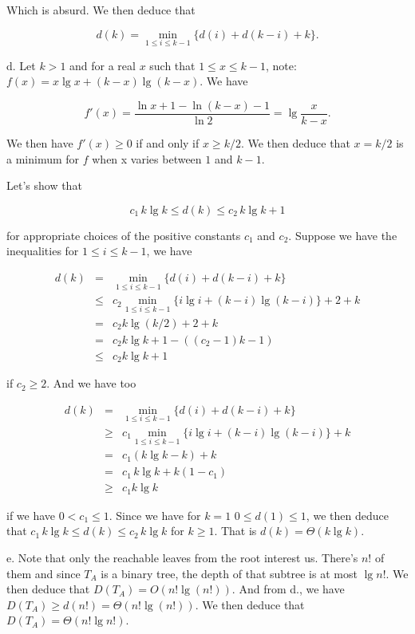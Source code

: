 \documentclass[a4paper,12pt]{article}
\newcommand{\subpar}[1]{\medskip \noindent #1.}
\begin{document}
Which is absurd.  We then deduce that

\[ d(k) = \min_{1\le i\le k-1}\{d(i) + d(k-i) + k\}.\]

\subpar{d}  Let $k>1$ and for a real $x$ such that $1 \le x\le k-1$,
note: $f(x) = x \lg x + (k-x)\lg (k-x)$.  We have

\[  f'(x) = \frac{\ln x + 1 - \ln(k-x) - 1}{\ln 2} = \lg\frac{x}{k-x}.\]

We then have $f'(x) \ge 0$ if and only if $x \ge k/2$.  We then deduce
that $x = k/2$ is a minimum for $f$ when x varies between $1$ and
$k-1$.

\medskip
Let's show that

\[ c_1\,k\lg k \le d(k) \le c_2\,k\lg k + 1\]

for appropriate choices of the positive constants $c_1$ and $c_2$.
Suppose we have the inequalities for $1\le i\le k-1$, we have

\begin{eqnarray*}
  d(k) &=& \min_{1\le i\le k-1}\{ d(i) + d(k-i) + k\} \\
  &\le& c_2 \min_{1\le i\le k-1}\{i\lg i + (k-i)\lg (k-i) \} + 2
  + k\\
  &=& c_2 k \lg (k/2) + 2 + k \\
  &=& c_2 k \lg k + 1 - ((c_2 - 1)k - 1) \\
  &\le& c_2 k\lg k + 1
\end{eqnarray*}

if $c_2 \ge 2$.  And we have too

\begin{eqnarray*}
  d(k) &=& \min_{1\le i\le k-1}\{ d(i) + d(k-i) + k\} \\
  &\ge& c_1 \min_{1\le i\le k-1}\{ i \lg i + (k-i)\lg(k-i)\} + k \\
  &=& c_1 (k \lg k - k) + k \\
  &=& c_1\,k \lg k + k(1-c_1) \\
  &\ge& c_1k\lg k
\end{eqnarray*}

if we have $0 < c_1 \le 1$.  Since we have for $k=1$ $0 \le d(1) \le
1$, we then deduce that $c_1\,k\lg k \le d(k) \le c_2\,k\lg k$ for
$k\ge 1$.  That is $d(k) = \Theta(k\lg k)$.

\subpar{e} Note that only the reachable leaves from the root interest
us.  There's $n!$ of them and since $T_A$ is a binary tree, the depth
of that subtree is at most $\lg n!$.  We then deduce that $D(T_A) =
O(n!  \lg(n!))$.  And from d., we have $D(T_A) \ge d(n!) = \Theta(n!
\lg (n!))$.  We then deduce that $D(T_A) = \Theta(n! \lg n!)$.
\end{document}
